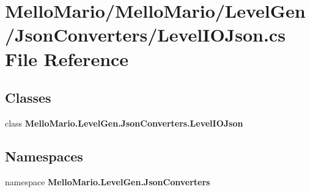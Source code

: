 \section{Mello\+Mario/\+Mello\+Mario/\+Level\+Gen/\+Json\+Converters/\+Level\+I\+O\+Json.cs File Reference}
\label{LevelIOJson_8cs}
\subsection*{Classes}
\begin{DoxyCompactItemize}
\item 
class \textbf{ Mello\+Mario.\+Level\+Gen.\+Json\+Converters.\+Level\+I\+O\+Json}
\end{DoxyCompactItemize}
\subsection*{Namespaces}
\begin{DoxyCompactItemize}
\item 
namespace \textbf{ Mello\+Mario.\+Level\+Gen.\+Json\+Converters}
\end{DoxyCompactItemize}
